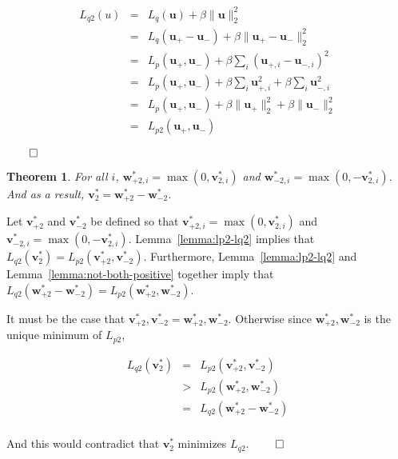 \documentclass[11pt,letterpaper]{article}
\newtheorem{theorem}{Theorem}[section]
\begin{document}
\begin{eqnarray}
L_{q2}(u) & = & L_q(\mathbf{u})+ \beta \|\mathbf{u}\|_2^2 \\
          & = & L_q(\mathbf{u}_+-\mathbf{u}_-) + \beta \|\mathbf{u}_+-\mathbf{u}_-\|_2^2 \\
          & = & L_p(\mathbf{u}_+,\mathbf{u}_-) + \beta\sum_i (\mathbf{u}_{+,i}-\mathbf{u}_{-,i})^2 \\
          & = & L_p(\mathbf{u}_+,\mathbf{u}_-) + \beta\sum_i \mathbf{u}_{+,i}^2 + \beta\sum_i \mathbf{u}_{-,i}^2 \\
          & = & L_p(\mathbf{u}_+,\mathbf{u}_-) + \beta \|\mathbf{u}_+\|_2^2+\beta\|\mathbf{u}_-\|_2^2 \\
          & = & L_{p2}(\mathbf{u}_+,\mathbf{u}_-)
\end{eqnarray}

$\qed$

\begin{theorem}
\label{thm:reg-one-two-relation}
 For all 
$i$, $\mathbf{w}^*_{+2,i}=\max(0, \mathbf{v}^*_{2,i})$ and 
$\mathbf{w}^*_{-2,i}=\max(0, -\mathbf{v}^*_{2,i})$.  And as a result,
$\mathbf{v}^*_2=\mathbf{w}^*_{+2}-\mathbf{w}^*_{-2}$.
\end{theorem}

Let $\mathbf{v}^*_{+2}$ and $\mathbf{v}^*_{-2}$ be defined so that 
$\mathbf{v}^*_{+2,i}=\max(0, \mathbf{v}^*_{2,i})$ and 
$\mathbf{v}^*_{-2,i}=\max(0, -\mathbf{v}^*_{2,i})$.
Lemma~\ref{lemma:lp2-lq2} implies that 
$L_{q2}(\mathbf{v}^*_2)=L_{p2}(\mathbf{v}^*_{+2},\mathbf{v}^*_{-2})$.  Furthermore,
Lemma~\ref{lemma:lp2-lq2} and
 Lemma~\ref{lemma:not-both-positive}
together imply that 
$L_{q2}(\mathbf{w}^*_{+2}-\mathbf{w}^*_{-2})=L_{p2}(\mathbf{w}^*_{+2},\mathbf{w}^*_{-2})$.

It must be the case that $\mathbf{v}^*_{+2},\mathbf{v}^*_{-2}=\mathbf{w}^*_{+2},\mathbf{w}^*_{-2}$.  
Otherwise since $\mathbf{w}^*_{+2},\mathbf{w}^*_{-2}$ is the unique minimum of
$L_{p2}$,

\begin{eqnarray}
L_{q2}(\mathbf{v}^*_2) & = & L_{p2}(\mathbf{v}^*_{+2},\mathbf{v}^*_{-2}) \\
              & > & L_{p2}(\mathbf{w}^*_{+2},\mathbf{w}^*_{-2}) \\
              & = & L_{q2}(\mathbf{w}^*_{+2}-\mathbf{w}^*_{-2}) \\
\end{eqnarray}

And this would contradict that $\mathbf{v}^*_2$ minimizes $L_{q2}$. $\qed$
\end{document}
